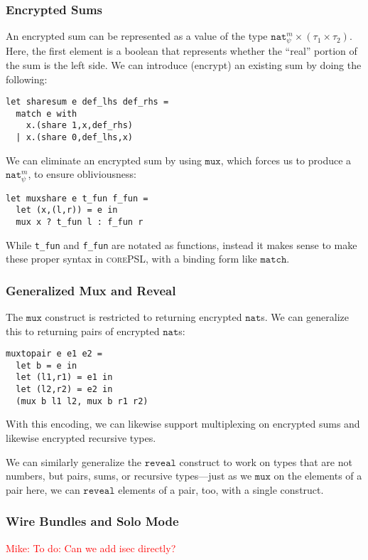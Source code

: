 \documentclass[10pt]{article}
\newcommand{\kw}[1]{\ensuremath{\mathtt{#1}}}
\newcommand{\tnat}{\ensuremath{\mathtt{nat}}}
\newcommand{\tpair}[2]{\ensuremath{{#1} \times {#2}}}
\newcommand{\lang}{\textsc{corePSL}\xspace}
\newcommand{\mwh}[1]{\textcolor{red}{Mike: #1}}
\begin{document}
\subsubsection{Encrypted Sums}

An encrypted sum can be represented as a value of the type
$\tpair{\tnat^m_\psi}{(\tpair{\tau_1}{\tau_2})}$. Here, the first
element is a boolean that represents whether the ``real'' portion of
the sum is the left side. We can introduce (encrypt) an existing sum
by doing the following:
\begin{verbatim}
let sharesum e def_lhs def_rhs =
  match e with
    x.(share 1,x,def_rhs)
  | x.(share 0,def_lhs,x)
\end{verbatim}
We can eliminate an encrypted sum by using $\kw{mux}$, which forces us
to produce a $\tnat^m_\psi$, to ensure obliviousness:
\begin{verbatim}
let muxshare e t_fun f_fun =
  let (x,(l,r)) = e in
  mux x ? t_fun l : f_fun r
\end{verbatim}
While \verb+t_fun+ and \verb+f_fun+ are notated as functions, instead
it makes sense to make these proper syntax in \lang, with a
binding form like $\kw{match}$.

\subsubsection{Generalized Mux and Reveal}
\label{sec:generalmux}

 The $\kw{mux}$ construct is restricted to returning encrypted
$\tnat$s. We can generalize this to returning pairs of encrypted
$\tnat$s:
\begin{verbatim}
muxtopair e e1 e2 =
  let b = e in
  let (l1,r1) = e1 in
  let (l2,r2) = e2 in
  (mux b l1 l2, mux b r1 r2)
\end{verbatim}
With this encoding, we can likewise support multiplexing on encrypted
sums and likewise encrypted recursive types.

We can similarly generalize the $\kw{reveal}$ construct to work on types
that are not numbers, but pairs, sums, or recursive types---just as we
\kw{mux} on the elements of a pair here, we can \kw{reveal} elements
of a pair, too, with a single construct.

\subsubsection{Wire Bundles and Solo Mode}

\mwh{To do: Can we add isec directly?}
\end{document}
